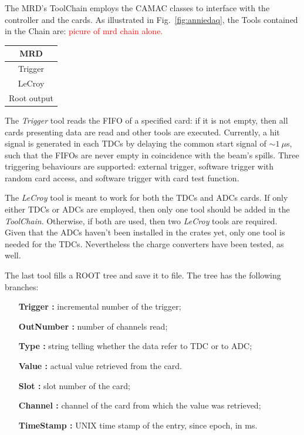 The MRD's ToolChain employs the CAMAC classes to interface with the controller and the cards.
As illustrated in Fig.~\ref{fig:anniedaq}, the Tools contained in the Chain are:
\textcolor{red}{picure of mrd chain alone.}

\begin{center}
  \small
  \begin{tabular}{c}
    \toprule
    \textbf{MRD}	\\
    \midrule
    Trigger	\\
    LeCroy 	\\
    Root output	\\
    \bottomrule
  \end{tabular}
\end{center}

The \emph{Trigger} tool reads the FIFO of a specified card: if it is not empty, then all %
cards presenting data are read and other tools are executed.
Currently, a hit signal is generated in each TDCs by delaying the common start %
signal of $\sim 1~\mu$s, such that the FIFOs are never empty in coincidence with the beam's spills.
Three triggering behaviours are supported: external trigger, software trigger with %
random card access, and software trigger with card test function.

The \emph{LeCroy} tool is meant to work for both the TDCs and ADCs cards.
If only either TDCs or ADCs are employed, then only one tool should be added in the \emph{ToolChain}.
Otherwise, if both are used, then two \emph{LeCroy} tools are required.
Given that the ADCs haven't been installed in the crates yet, only one tool is %
needed for the TDCs.
Nevertheless the charge converters have been tested, as well.

The last tool fills a ROOT tree and save it to file.
The tree has the following branches:
\begin{center}
\begin{varwidth}{\textwidth}
\begin{itemize}
  \item[\bfseries Trigger :] incremental number of the trigger;
  \item[\bfseries OutNumber :] number of channels read;
  \item[\bfseries Type :] string telling whether the data refer to TDC or to ADC;
  \item[\bfseries Value :] actual value retrieved from the card.
  \item[\bfseries Slot :] slot number of the card;
  \item[\bfseries Channel :] channel of the card from which the value was retrieved;
  \item[\bfseries TimeStamp :] UNIX time stamp of the entry, since epoch, in ms.
\end{itemize}
\end{varwidth}
\end{center}


